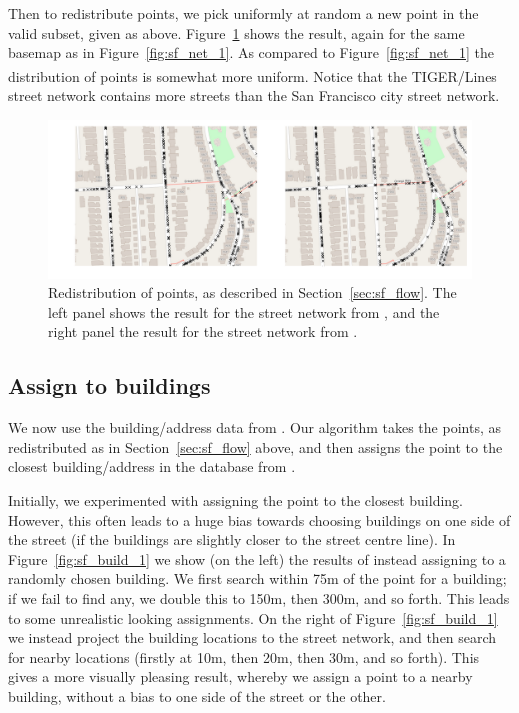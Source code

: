\documentclass[twoside,a4paper,twocolumn,10pt]{article}
\theoremstyle{plain}
\theoremstyle{definition}
\newcommand{\regsym}{\textsuperscript{\textregistered}}
\begin{document}
Then to redistribute points, we pick uniformly at random a new point in the valid subset,
given as above.  Figure~\ref{fig:sf_flow_redist} shows the result, again for the same
basemap as in Figure~\ref{fig:sf_net_1}.  As compared to Figure~\ref{fig:sf_net_1} the
distribution of points is somewhat more uniform.  Notice that the TIGER/Lines\regsym
street network contains more streets than the San Francisco city street network.

\begin{figure}
  \includegraphics[width=\textwidth]{sf_redist_flow_network.png}
  \caption{Redistribution of points, as described in Section~\ref{sec:sf_flow}.
The left panel shows the result for the street network from \cite{sfgeo}, and the right
panel the result for the street network from \cite{tiger}.}
  \label{fig:sf_flow_redist}
\end{figure}



\subsection{Assign to buildings}\label{sec:sf_assign_to_buildings}

We now use the building/address data from \cite{oa}.  Our algorithm takes the points,
as redistributed as in Section~\ref{sec:sf_flow} above, and then assigns the point to
the closest building/address in the database from \cite{oa}.

Initially, we experimented with assigning the point to the closest building.  However,
this often leads to a huge bias towards choosing buildings on one side of the street
(if the buildings are slightly closer to the street centre line).  In Figure~\ref{fig:sf_build_1}
we show (on the left) the results of instead assigning to a randomly chosen building.  We
first search within 75m of the point for a building; if we fail to find any, we double this
to 150m, then 300m, and so forth.  This leads to some unrealistic looking assignments.
On the right of Figure~\ref{fig:sf_build_1} we instead project the building locations to the
street network, and then search for nearby locations (firstly at 10m, then 20m, then 30m,
and so forth).  This gives a more visually pleasing result, whereby we assign a point to
a nearby building, without a bias to one side of the street or the other.
\end{document}
